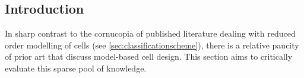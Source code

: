 



\subsection{Introduction}

In sharp contrast to the cornucopia of published literature dealing with reduced
order  modelling  of cells  (see  \cref{sec:classificationscheme}),  there is  a
relative paucity of prior art that discuss model-based cell design. This section
aims to critically evaluate this sparse pool of knowledge.

